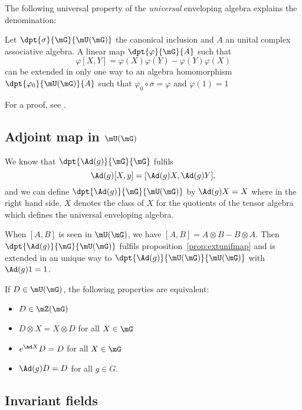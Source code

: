 The following universal property of the \emph{universal} enveloping algebra explains the denomination:
\begin{proposition}
Let $\dpt{\sigma}{\mG}{\mU(\mG)}$ the canonical inclusion and $A$ an unital complex associative algebra. A linear map $\dpt{\varphi}{\mG}{A}$ such that
\begin{equation}
\varphi[X,Y]=\varphi(X)\varphi(Y)-\varphi(Y)\varphi(X)
\end{equation}
can be extended in only one way to an algebra homomorphism $\dpt{\varphi_0}{\mU(\mG)}{A}$ such that $\varphi_0\circ\sigma=\varphi$ and $\varphi(1)=1$
\label{prop:extunifmap}
\end{proposition}
For a proof, see \cite{Knapp_reprez}.

\subsection{Adjoint map in \texorpdfstring{$\mU(\mG)$}{U(G)}}   \label{ssadjunif}

We know that $\dpt{ \Ad(g) }{ \mG }{ \mG }$ fulfils
\[
  \Ad(g)[X,y]=[  \Ad(g)X,\Ad(g)Y  ],
\]
and we can define $\dpt{ \Ad(g) }{ \mG }{ \mU(\mG) }$ by $\Ad(g)X=X$ where in the right hand side, $X$ denotes the class of $X$ for the quotients of the tensor algebra which defines the universal enveloping algebra.

When $[A,B]$ is seen in $\mU(\mG)$, we have $[A,B]=A\otimes B-B\otimes A$. Then $\dpt{ \Ad(g) }{ \mG }{ \mU(\mG) }$ fulfils proposition~\ref{prop:extunifmap} and is extended in an unique way to $\dpt{ \Ad(g) }{ \mU(\mG) }{ \mU(\mG) }$ with $\Ad(g)1=1$.

\begin{lemma}
    If $D\in\mU(\mG)$, the following properties are equivalent:
    \begin{itemize}
        \item $D\in\mZ(\mG)$
        \item $D\otimes X=X\otimes D$ for all $X\in \mG$
        \item $e^{\ad X}D=D$ for all $X\in\mG$
        \item $\Ad(g)D=D$ for all $g\in G$.
    \end{itemize}
     \label{lem:equivDAd}
\end{lemma}

\subsection{Invariant fields}


